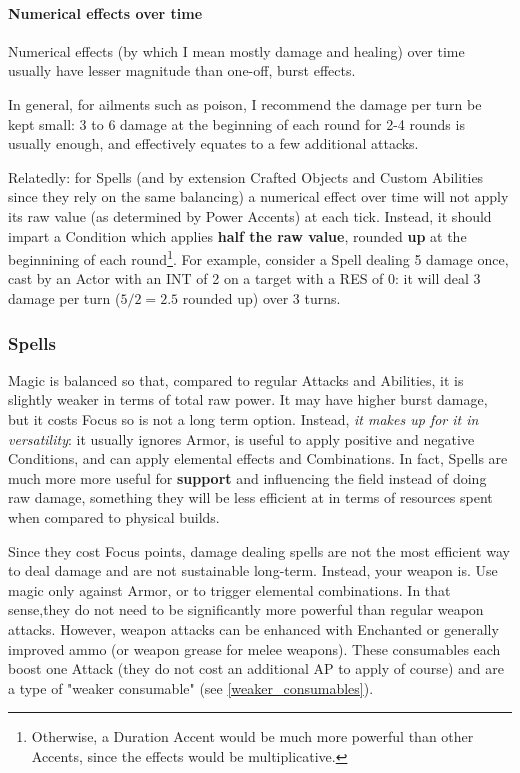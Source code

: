 \paragraph{Numerical effects over time}

\label{numerical_effect_over_time}

Numerical effects (by which I mean mostly damage and healing) over time usually have lesser magnitude than one-off, burst effects. 

In general, for ailments such as poison, I recommend the damage per turn be kept small: 3 to 6 damage at the beginning of each round for 2-4 rounds is usually enough, and effectively equates to a few additional attacks.

Relatedly: for Spells (and by extension Crafted Objects and Custom Abilities since they rely on the same balancing)  a numerical effect over time will not apply its raw value (as determined by Power Accents) at each tick. Instead, it should impart a Condition which applies \textbf{half the raw value}, rounded \textbf{up} at the beginnining of each round\footnote{Otherwise, a Duration Accent would be much more powerful than other Accents, since the effects would be multiplicative.}. For example, consider a Spell dealing 5 damage once, cast by an Actor with an INT of 2 on a target with a RES of 0: it will deal 3 damage per turn ($5/2=2.5$ rounded up) over 3 turns.




\subsubsection{Spells}
\label{balancing_spells}

Magic is balanced so that, compared to regular Attacks and Abilities, it is slightly weaker in terms of total raw power. It may have higher burst damage, but it costs Focus so is not a long term option. Instead, \textit{it makes up for it in versatility}: it usually ignores Armor, is useful to apply positive and negative Conditions, and can apply elemental effects and Combinations. In fact, Spells are much more more useful for \textbf{support} and influencing the field instead of doing raw damage, something they will be less efficient at in terms of resources spent when compared to physical builds.

Since they cost Focus points, damage dealing spells are not the most efficient way to deal damage and are not sustainable long-term. Instead, your weapon is. Use magic only against Armor, or to trigger elemental combinations. In that sense,they do not need to be significantly more powerful than regular weapon attacks. However, weapon attacks can be enhanced with Enchanted or generally improved ammo (or weapon grease for melee weapons). These consumables each boost one Attack (they do not cost an additional AP to apply of course) and are a type of "weaker consumable" (see \ref{weaker_consumables}).

